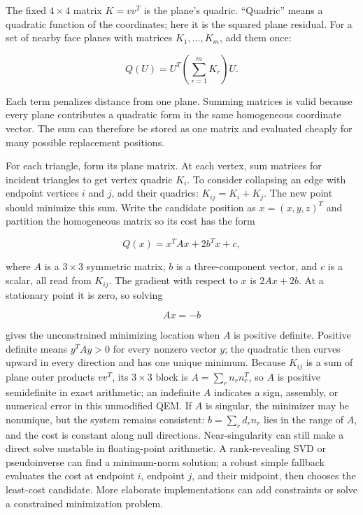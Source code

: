 The fixed \(4\times4\) matrix \(K=vv^T\) is the plane's quadric. ``Quadric'' means a quadratic function of the coordinates; here it is the squared plane residual. For a set of nearby face planes with matrices \(K_1,\ldots,K_m\), add them once:

\[
Q(U)=U^T\left(\sum_{r=1}^{m}K_r\right)U.
\]

Each term penalizes distance from one plane. Summing matrices is valid because every plane contributes a quadratic form in the same homogeneous coordinate vector. The sum can therefore be stored as one matrix and evaluated cheaply for many possible replacement positions.

For each triangle, form its plane matrix. At each vertex, sum matrices for incident triangles to get vertex quadric \(K_i\). To consider collapsing an edge with endpoint vertices \(i\) and \(j\), add their quadrics: \(K_{ij}=K_i+K_j\). The new point should minimize this sum. Write the candidate position as \(x=(x,y,z)^T\) and partition the homogeneous matrix so its cost has the form

\[
Q(x)=x^TAx+2b^Tx+c,
\]

where \(A\) is a \(3\times3\) symmetric matrix, \(b\) is a three-component vector, and \(c\) is a scalar, all read from \(K_{ij}\). The gradient with respect to \(x\) is \(2Ax+2b\). At a stationary point it is zero, so solving

\[
Ax=-b
\]

gives the unconstrained minimizing location when \(A\) is positive definite. Positive definite means \(y^TAy>0\) for every nonzero vector \(y\); the quadratic then curves upward in every direction and has one unique minimum. Because \(K_{ij}\) is a sum of plane outer products \(vv^T\), its \(3\times3\) block is \(A=\sum_r n_r n_r^T\), so \(A\) is positive semidefinite in exact arithmetic; an indefinite \(A\) indicates a sign, assembly, or numerical error in this unmodified QEM. If \(A\) is singular, the minimizer may be nonunique, but the system remains consistent: \(b=\sum_r d_r n_r\) lies in the range of \(A\), and the cost is constant along null directions. Near-singularity can still make a direct solve unstable in floating-point arithmetic. A rank-revealing SVD or pseudoinverse can find a minimum-norm solution; a robust simple fallback evaluates the cost at endpoint \(i\), endpoint \(j\), and their midpoint, then chooses the least-cost candidate. More elaborate implementations can add constraints or solve a constrained minimization problem.

